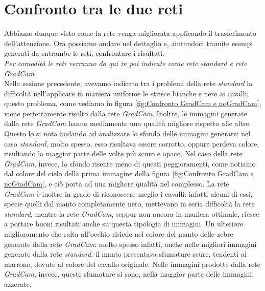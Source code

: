 \section{Confronto tra le due reti}
Abbiamo dunque visto come la rete venga migliorata applicando il trasferimento dell'attenzione. Ora possiamo andare nel dettaglio e, aiutandoci tramite esempi generati da entrambe le reti, confrontare i risultati.
\\\emph{Per comodità le reti verranno da qui in poi indicate come rete \emph{standard} e rete \emph{GradCam}}
\\Nella sezione precedente, avevamo indicato tra i problemi della rete \emph{standard} la difficoltà nell'applicare in maniera uniforme le strisce bianche e nere ai cavalli; questo problema, come vediamo in figura \ref{fig:Confronto GradCam e noGradCam}, viene perfettamente risolto dalla rete \emph{GradCam}. Inoltre, le immagini generate dalla rete \emph{GradCam} hanno mediamente una qualità migliore rispetto alle altre. Questo lo si nota andando ad analizzare lo sfondo delle immagini generate: nel caso \emph{standard}, molto spesso, esso risultava essere corrotto, oppure perdeva colore, risultando la maggior parte delle volte più scuro e opaco. Nel caso della rete \emph{GradCam}, invece, lo sfondo risente meno di questi peggioramenti, come notiamo dal colore del cielo della prima immagine della figura \ref{fig:Confronto GradCam e noGradCam}, e ciò porta ad una migliore qualità nel complesso. La rete \emph{GradCam} è inoltre in grado di riconoscere meglio i cavalli: infatti alcuni di essi, specie quelli dal manto completamente nero, mettevano in seria difficoltà la rete \emph{standard}, mentre la rete \emph{GradCam}, seppur non ancora in maniera ottimale, riesce a portare buoni risultati anche su questa tipologia di immagini.
Un ulteriore miglioramento che salta all'occhio risiede nel colore del manto delle zebre generate dalla rete \emph{GradCam}: molto spesso infatti, anche nelle migliori immagini generate dalla rete \emph{standard}, il manto presentava sfumature scure, tendenti al marrone, dovute al colore del cavallo originale. Nelle immagini prodotte dalla rete \emph{GradCam}, invece, queste sfumature si sono, nella maggior parte delle immagini, azzerate.



